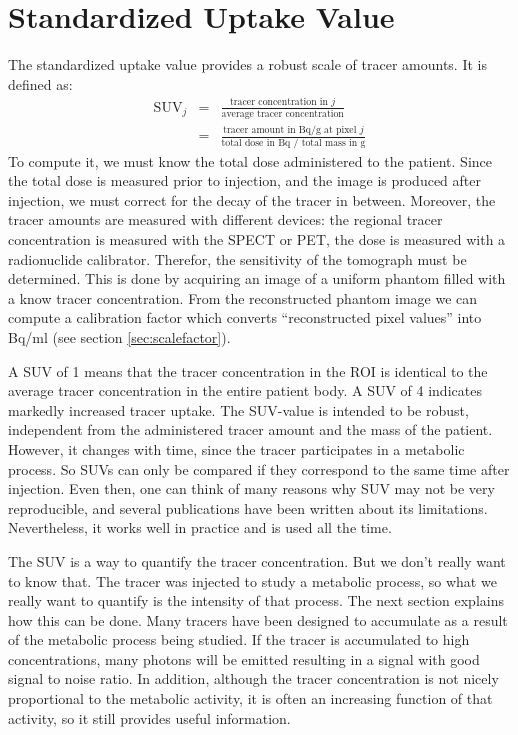 \section{Standardized Uptake Value}
The standardized uptake value provides a robust scale of tracer amounts. It is
defined as:
\begin{align}
  \mbox{SUV}_j & = & \frac{\mbox{tracer concentration in $j$}}
                          {\mbox{average tracer concentration}}\\
  & = & \frac{\mbox{tracer amount in Bq/g at pixel $j$}}
                      {\mbox{total dose in Bq / total mass in g}}
\end{align}
To compute it, we must know the total dose administered to the patient. Since
the total dose is measured prior to injection, and the image is produced after
injection, we must correct for the decay of the tracer in between. Moreover,
the tracer amounts are measured with different devices: the regional tracer
concentration is measured with the SPECT or PET, the dose is measured with a
radionuclide calibrator. Therefor, the sensitivity of the tomograph must be
determined. This is done by acquiring an image of a uniform phantom filled
with a know tracer concentration. From the reconstructed phantom image we can
compute a calibration factor which converts ``reconstructed pixel values''
into Bq/ml (see section \ref{sec:scalefactor}).

A SUV of 1 means that the tracer concentration in the ROI is identical
to the average tracer concentration in the entire patient body. A SUV
of 4 indicates markedly increased tracer uptake. The SUV-value is
intended to be robust, independent from the administered tracer amount
and the mass of the patient. However, it changes with time, since the
tracer participates in a metabolic process. So SUVs can only be
compared if they correspond to the same time after injection. Even
then, one can think of many reasons why SUV may not be very
reproducible, and several publications have been written about its
limitations.  Nevertheless, it works well in practice and is used all
the time.

The SUV is a way to quantify the tracer concentration. But we don't really
want to know that. The tracer was injected to study a metabolic process, so
what we really want to quantify is the intensity of that process. The next
section explains how this can be done. Many tracers have been designed to
accumulate as a result of the metabolic process being studied. If the tracer
is accumulated to high concentrations, many photons will be emitted resulting
in a signal with good signal to noise ratio. In addition, although the tracer
concentration is not nicely proportional to the metabolic activity, it is
often an increasing function of that activity, so it still provides useful
information.

